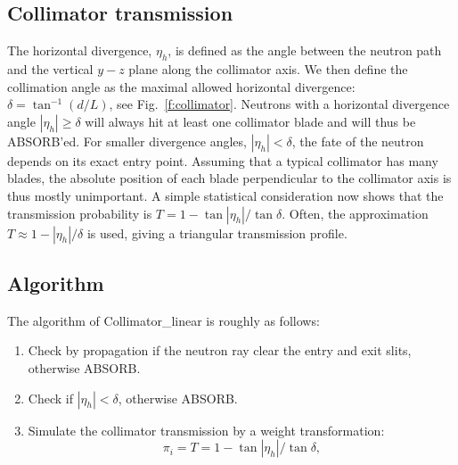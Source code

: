 \subsection{Collimator transmission}
The horizontal divergence, $\eta_h$, is defined as the angle between the
neutron path and the vertical $y-z$ plane along the collimator axis.
We then define the collimation angle as the maximal allowed
horizontal divergence: $\delta = \tan^{-1}(d/L)$,
see Fig.~\ref{f:collimator}. Neutrons with a horizontal
divergence angle $|\eta_h| \geq \delta$ will always
hit at least one collimator blade and will thus be ABSORB'ed.
For smaller divergence angles, $|\eta_h| < \delta$, the fate of the
neutron depends on its exact entry point.
Assuming that a typical collimator has many blades, the
absolute position of each blade perpendicular to the collimator axis
is thus mostly unimportant.
A simple statistical consideration now shows that the transmission
probability is $T = 1-\tan|\eta_h|/\tan\delta$.
Often, the approximation $T \approx 1-|\eta_h|/\delta$ is used, giving
a triangular transmission profile.

\subsection{Algorithm}
The algorithm of {\rm Collimator\_linear} is roughly as follows:
\begin{enumerate}
\item Check by propagation if the neutron ray clear the entry and exit slits,
otherwise ABSORB.
\item Check if $|\eta_h| < \delta$, otherwise ABSORB.
\item Simulate the collimator transmission by a weight transformation:
\begin{equation}
\pi_i = T = 1-\tan|\eta_h|/ \tan\delta ,
\end{equation}
\end{enumerate}
